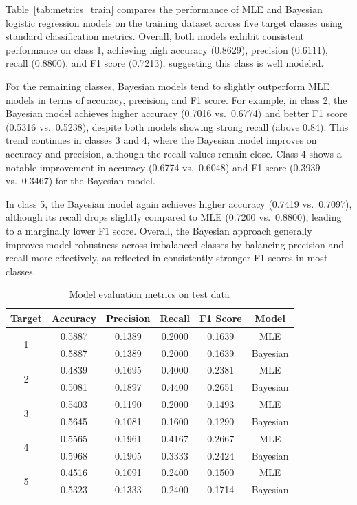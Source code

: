 Table~\ref{tab:metrics_train} compares the performance of MLE and Bayesian logistic 
regression models on the training dataset across five target classes using standard 
classification metrics. Overall, both models exhibit consistent performance on class 1,
 achieving high accuracy (0.8629), precision (0.6111), recall (0.8800), and F1 score (0.7213),
  suggesting this class is well modeled.

For the remaining classes, Bayesian models tend to slightly outperform MLE models
 in terms of accuracy, precision, and F1 score. For example, in class 2, the Bayesian 
 model achieves higher accuracy (0.7016 vs.\ 0.6774) and better F1 score (0.5316 vs.\ 0.5238),
  despite both models showing strong recall (above 0.84).
   This trend continues in classes 3 and 4, where the Bayesian model improves
    on accuracy and precision, although the recall values remain close.
     Class 4 shows a notable improvement in accuracy (0.6774 vs.\ 0.6048) 
     and F1 score (0.3939 vs.\ 0.3467) for the Bayesian model.

In class 5, the Bayesian model again achieves higher accuracy (0.7419 vs.\ 0.7097), 
although its recall drops slightly compared to MLE (0.7200 vs.\ 0.8800), leading to a
 marginally lower F1 score. Overall, the Bayesian approach generally improves model 
 robustness across imbalanced classes by balancing precision and recall more effectively, 
 as reflected in consistently stronger F1 scores in most classes.


 \begin{table}[!h]
    \centering
    \caption{Model evaluation metrics on test data}
    \label{tab:metrics_test}
    \begin{tabular}{cccccc}
    \toprule
    \textbf{Target} & \textbf{Accuracy} & \textbf{Precision} & \textbf{Recall} & \textbf{F1 Score} & \textbf{Model} \\
    \midrule
    \multirow{2}{*}{1} & 0.5887 & 0.1389 & 0.2000 & 0.1639 & MLE \\
                       & 0.5887 & 0.1389 & 0.2000 & 0.1639 & Bayesian \\
    \midrule
    \multirow{2}{*}{2} & 0.4839 & 0.1695 & 0.4000 & 0.2381 & MLE \\
                       & 0.5081 & 0.1897 & 0.4400 & 0.2651 & Bayesian \\
    \midrule
    \multirow{2}{*}{3} & 0.5403 & 0.1190 & 0.2000 & 0.1493 & MLE \\
                       & 0.5645 & 0.1081 & 0.1600 & 0.1290 & Bayesian \\
    \midrule
    \multirow{2}{*}{4} & 0.5565 & 0.1961 & 0.4167 & 0.2667 & MLE \\
                       & 0.5968 & 0.1905 & 0.3333 & 0.2424 & Bayesian \\
    \midrule
    \multirow{2}{*}{5} & 0.4516 & 0.1091 & 0.2400 & 0.1500 & MLE \\
                       & 0.5323 & 0.1333 & 0.2400 & 0.1714 & Bayesian \\
    \bottomrule
    \end{tabular}
\end{table}

